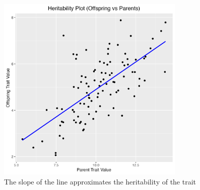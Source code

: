 \documentclass[12pt,a4paper]{article}
\begin{document}
\tableofcontents
\begin{figure}[h] %
    \centering
    \includegraphics[width=0.8\textwidth]{heritability_plot.png} %
    \caption{The slope of the line approximates the heritability of the trait}
    \label{fig:Heritability} %
\end{figure}
\newpage
\end{document}
